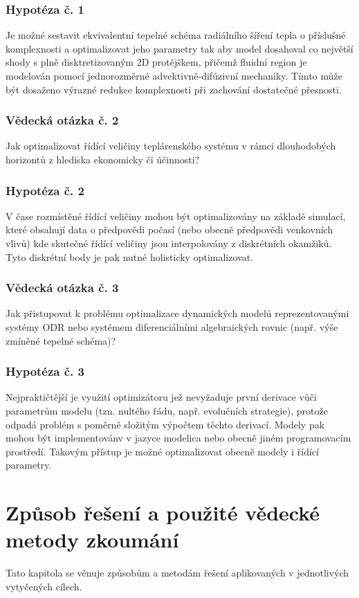 \subsection*{Hypotéza č. 1}
Je možné sestavit ekvivalentní tepelné schéma radiálního šíření tepla o
příslušné komplexnosti a optimalizovat jeho parametry tak aby model dosahoval
co největší shody s plně disktretizovaným 2D protějškem, přičemž fluidní
region je modelován pomocí jednorozměrné advektivně-difúzivní mechaniky. Tímto
může být dosaženo výrazné redukce komplexnosti při zachování dostatečné
přesnosti.
\subsection*{Vědecká otázka č. 2}
Jak optimalizovat řídící veličiny teplárenského systému v rámci dlouhodobých
horizontů z hlediska ekonomicky či účinnosti?
\subsection*{Hypotéza č. 2}
V čase rozmístěné řídící veličiny mohou být optimalizovány na základě simulací,
které obsahují data o předpovědi počasí (nebo obecně předpovědi venkovních
vlivů) kde skutečné řídící veličiny jsou interpolovány z diskrétních okamžiků.
Tyto diskrétní body je pak nutné holisticky optimalizovat.
\subsection*{Vědecká otázka č. 3}
Jak přistupovat k problému optimalizace dynamických modelů reprezentovanými
systémy ODR nebo systémem diferenciálními algebraických rovnic (např. výše
zmíněné tepelné schéma)?
\subsection*{Hypotéza č. 3}
Nejpraktičtější je využití optimizátoru jež nevyžaduje první derivace vůči
parametrům modelu (tzn. nultého řádu, např. evolučních strategie), protože
odpadá problém s poměrně složitým výpočtem těchto derivací. Modely pak mohou
být implementovánv v jazyce modelica nebo obecně jiném programovacím prostředí.
Takovým přístup je možné optimalizovat obecně modely i řídící parametry.
\chapter{Způsob řešení a použité vědecké metody zkoumání}
Tato kapitola se věnuje způsobům a metodám řešení aplikovaných v jednotlivých
vytyčených cílech.
